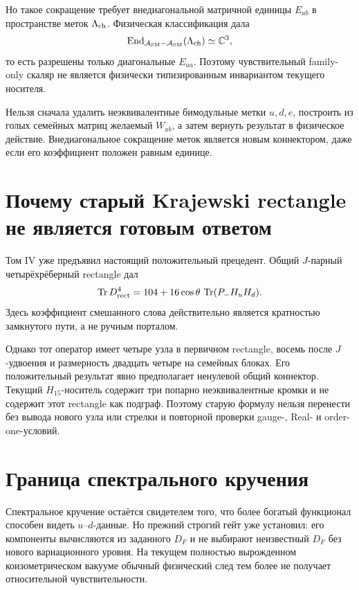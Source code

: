 Но такое сокращение требует внедиагональной матричной единицы
$E_{ab}$ в пространстве меток $\Lambda_{\rm ch}$. Физическая классификация
дала
\begin{equation}
 \operatorname{End}_{\mathcal A_{\rm SM}-\mathcal A_{\rm SM}}
 (\Lambda_{\rm ch})\simeq\mathbb C^3,
 \label{eq:v7-quartic-edge-commutant}
\end{equation}
то есть разрешены только диагональные $E_{aa}$. Поэтому чувствительный
family-only скаляр не является физически типизированным инвариантом
текущего носителя.

\begin{nogocriterion}
Нельзя сначала удалить неэквивалентные бимодульные метки $u,d,e$, построить
из голых семейных матриц желаемый $W_{ab}$, а затем вернуть результат в
физическое действие. Внедиагональное сокращение меток является новым
коннектором, даже если его коэффициент положен равным единице.
\end{nogocriterion}

\section{Почему старый Krajewski rectangle не является готовым ответом}

Том IV уже предъявил настоящий положительный прецедент. Общий
$J$-парный четырёхрёберный rectangle дал
\begin{equation}
 \operatorname{Tr} D_{\rm rect}^4
 =104+16\cos\theta\,\operatorname{Tr}(P_-H_uH_d).
 \label{eq:v7-krajewski-cross-word-precedent}
\end{equation}
Здесь коэффициент смешанного слова действительно является кратностью
замкнутого пути, а не ручным порталом.

Однако тот оператор имеет четыре узла в первичном rectangle, восемь после
$J$-удвоения и размерность двадцать четыре на семейных блоках. Его
положительный результат явно предполагает ненулевой общий коннектор.
Текущий $H_{15}$-носитель содержит три попарно неэквивалентные кромки и не
содержит этот rectangle как подграф. Поэтому старую формулу нельзя перенести
без вывода нового узла или стрелки и повторной проверки gauge-, Real- и
order-one-условий.

\section{Граница спектрального кручения}

Спектральное кручение остаётся свидетелем того, что более богатый
функционал способен видеть $u$--$d$-данные. Но прежний строгий гейт уже
установил: его компоненты вычисляются из заданного $D_F$ и не выбирают
неизвестный $D_F$ без нового вариационного уровня. На текущем полностью
вырожденном коизометрическом вакууме обычный физический след тем более не
получает относительной чувствительности.

